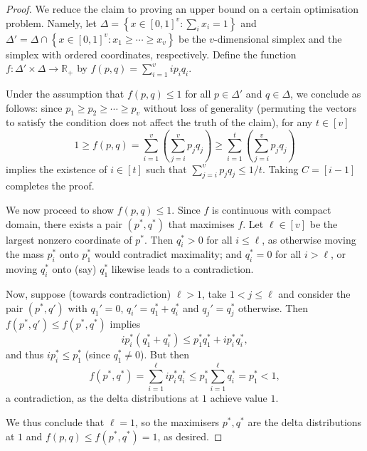 \documentclass[10pt,a4paper]{article}
\theoremstyle{definition}
\newcommand{\R}{\mathbb R}
\renewcommand{\set}[1]{\left\{#1\right\}}
\newcommand{\vcommitlength}{v}
\begin{document}
\begin{proof}
    We reduce the claim to proving an upper bound on a certain optimisation problem. Namely, let $\Delta = \set{x \in [0,1]^\vcommitlength : \sum_i x_i = 1}$ and $\Delta' = \Delta \cap \set{x \in [0,1]^\vcommitlength : x_1 \geq \cdots \geq x_\vcommitlength}$ be the $\vcommitlength$-dimensional simplex and the simplex with ordered coordinates, respectively. Define the function $f: \Delta' \times \Delta \to \R_+$ by $f(p,q) = \sum_{i = 1}^\vcommitlength i p_i q_i$.
    
    Under the assumption that $f(p,q) \leq 1$ for all $p \in \Delta'$ and $q \in \Delta$, we conclude as follows: since $p_1 \geq p_2 \geq \cdots \geq p_\vcommitlength$ without loss of generality (permuting the vectors to satisfy the condition does not affect the truth of the claim), for any $t \in [\vcommitlength]$
    \begin{equation*}
        1 \geq f(p,q) = \sum_{i = 1}^\vcommitlength \left(\sum_{j = i}^{\vcommitlength} p_j q_j \right) \geq \sum_{i = 1}^t \left( \sum_{j = i}^\vcommitlength p_j q_j \right)
    \end{equation*}
    implies the existence of $i \in [t]$ such that $\sum_{j = i}^\vcommitlength p_j q_j \leq 1/t$. Taking $C = [i - 1]$ completes the proof.

    We now proceed to show $f(p,q) \leq 1$. Since $f$ is continuous with compact domain, there exists a pair $(p^*, q^*)$ that maximises $f$. Let $\ell \in [\vcommitlength]$ be the largest nonzero coordinate of $p^*$. Then $q_i^* > 0$ for all $i \leq \ell$, as otherwise moving the mass $p_i^*$ onto $p_1^*$ would contradict maximality;  and $q_i^* = 0$ for all $i > \ell$, or moving $q_i^*$ onto (say) $q_1^*$ likewise leads to a contradiction.

    Now, suppose (towards contradiction) $\ell > 1$, take $1 < j \leq \ell$ and consider the pair $(p^*, q')$ with $q_1' = 0$, $q_i' = q_1^* + q_i^*$ and $q_j' = q_j^*$ otherwise. Then $f(p^*, q') \leq f(p^*, q^*)$ implies
    \begin{equation*}
      i p_i^* (q_1^* + q_i^*) \leq p_1^* q_1^* + i p_i^* q_i^*,
    \end{equation*}
    and thus $i p_i^* \leq p_1^*$ (since $q_1^* \neq 0$). But then
    \begin{equation*}
        f(p^*, q^*) = \sum_{i = 1}^\ell i p_i^* q_i^* \leq p_1^* \sum_{i = 1}^\ell q_i^* = p_1^* < 1,
    \end{equation*}
    a contradiction, as the delta distributions at $1$ achieve value $1$.
    
    We thus conclude that $\ell = 1$, so the maximisers $p^*, q^*$ are the delta distributions at $1$ and $f(p,q) \leq  f(p^*,q^*) = 1$, as desired.
\end{proof}
\end{document}
